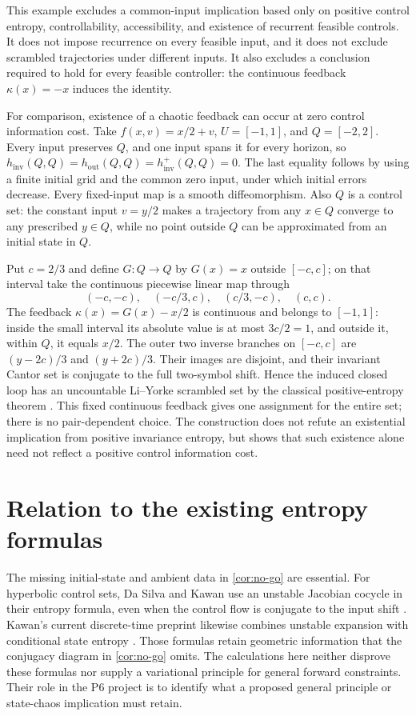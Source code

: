 \documentclass[11pt,a4paper]{article}
\theoremstyle{remark}
\newcommand{\hinv}{h_{\mathrm{inv}}}
\newcommand{\hout}{h_{\mathrm{out}}}
\newcommand{\htrack}{h_{\mathrm{inv}}^+}
\begin{document}
This example excludes a common-input implication based only on positive
control entropy, controllability, accessibility, and existence of recurrent
feasible controls. It does not impose recurrence on every feasible input,
and it does not exclude scrambled trajectories under different inputs.
It also excludes a conclusion required to hold for every feasible
controller: the continuous feedback $\kappa(x)=-x$ induces the identity.

For comparison, existence of a chaotic feedback can occur at zero control
information cost. Take $f(x,v)=x/2+v$, $U=[-1,1]$, and $Q=[-2,2]$.
Every input preserves $Q$, and one input spans it for every horizon, so
$\hinv(Q,Q)=\hout(Q,Q)=\htrack(Q,Q)=0$.
The last equality follows by using a finite initial grid and the common
zero input, under which initial errors decrease.
Every fixed-input map is a smooth diffeomorphism. Also $Q$ is a control
set: the constant input $v=y/2$ makes a trajectory from any $x\in Q$
converge to any prescribed $y\in Q$, while no point outside $Q$ can be
approximated from an initial state in $Q$.

Put $c=2/3$ and define $G:Q\to Q$ by $G(x)=x$ outside $[-c,c]$;
on that interval take
the continuous piecewise linear map through
\[
 (-c,-c),\quad(-c/3,c),\quad(c/3,-c),\quad(c,c).
\]
The feedback $\kappa(x)=G(x)-x/2$ is continuous and belongs to $[-1,1]$:
inside the small interval its absolute value is at most $3c/2=1$, and
outside it, within $Q$, it equals $x/2$.
The outer two inverse branches on $[-c,c]$ are
$(y-2c)/3$ and $(y+2c)/3$. Their images are disjoint, and their invariant
Cantor set is conjugate to the full two-symbol shift. Hence the induced
closed loop has an uncountable Li--Yorke scrambled set by the classical
positive-entropy theorem \cite{BGKM}.
This fixed continuous feedback gives one assignment for the entire set;
there is no pair-dependent choice. The construction does not refute an
existential implication from positive invariance entropy, but shows that
such existence alone need not reflect a positive control information cost.

\section{Relation to the existing entropy formulas}

The missing initial-state and ambient data in \cref{cor:no-go} are
essential. For hyperbolic control sets, Da Silva and Kawan use an unstable
Jacobian cocycle in their entropy formula, even when the control flow is
conjugate to the input shift \cite{DSK}. Kawan's current discrete-time
preprint likewise combines unstable expansion with conditional state
entropy \cite{Kawan}. Those formulas retain geometric information that
the conjugacy diagram in \cref{cor:no-go} omits.
The calculations here neither disprove these formulas nor supply a
variational principle for general forward constraints.
Their role in the P6 project is to identify what a proposed general
principle or state-chaos implication must retain.
\end{document}
